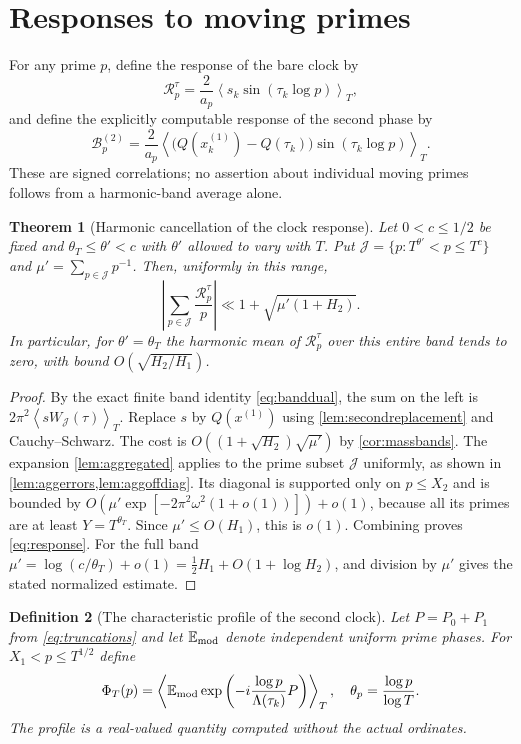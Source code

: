 \documentclass[11pt,reqno]{amsart}
\numberwithin{equation}{section}
\newtheorem{theorem}{Theorem}[section]
\newtheorem{definition}[theorem]{Definition}
\newcommand{\av}[1]{\left\langle #1\right\rangle_T}
\begin{document}
\section{Responses to moving primes}\label{sec:responses}
For any prime $p$, define the response of the bare clock by
\begin{equation}\label{eq:Rresponse}
\mathcal R_p^\tau
=\frac2{a_p}\av{s_k\sin(\tau_k\log p)},
\end{equation}
and define the explicitly computable response of the second
phase by
\begin{equation}\label{eq:Bresponse}
\mathcal B_p^{(2)}
=\frac2{a_p}\av{\bigl(Q(x_k^{(1)})-Q(\tau_k)\bigr)
\sin(\tau_k\log p)}.
\end{equation}
These are signed correlations; no assertion about individual
moving primes follows from a harmonic-band average alone.

\begin{theorem}[Harmonic cancellation of the clock response]
\label{thm:response}
Let $0<c\le1/2$ be fixed and
$\theta_T\le\theta'<c$ with $\theta'$ allowed to vary with $T$.
Put
$\mathcal J=\{p:T^{\theta'}<p\le T^c\}$ and
$\mu'=\sum_{p\in\mathcal J}p^{-1}$.
Then, uniformly in this range,
\begin{equation}\label{eq:response}
\left|\sum_{p\in\mathcal J}\frac{\mathcal R_p^\tau}{p}\right|
\ll1+\sqrt{\mu'(1+H_2)}.
\end{equation}
In particular, for $\theta'=\theta_T$ the harmonic mean of
$\mathcal R_p^\tau$ over this entire band tends to zero,
with bound $O(\sqrt{H_2/H_1})$.
\end{theorem}
\begin{proof}
By the exact finite band identity \eqref{eq:banddual}, the sum
on the left is $2\pi^2\av{sW_{\mathcal J}(\tau)}$.
Replace $s$ by $Q(x^{(1)})$ using
\cref{lem:secondreplacement} and Cauchy--Schwarz.
The cost is $O((1+\sqrt{H_2})\sqrt{\mu'})$ by
\cref{cor:massbands}.  The expansion
\cref{lem:aggregated} applies to the prime subset $\mathcal J$
uniformly, as shown in \cref{lem:aggerrors,lem:aggoffdiag}.
Its diagonal is supported only on $p\le X_2$ and is bounded
by $O(\mu'\exp[-2\pi^2\omega^2(1+o(1))])+o(1)$,
because all its primes are at least $Y=T^{\theta_T}$.
Since $\mu'\le O(H_1)$, this is $o(1)$.
Combining proves \eqref{eq:response}.
For the full band $\mu'=\log(c/\theta_T)+o(1)
=\tfrac12H_1+O(1+\log H_2)$, and division by $\mu'$
gives the stated normalized estimate.
\end{proof}

\begin{definition}[The characteristic profile of the second clock]
\label{def:profile}
Let $P=P_0+P_1$ from \eqref{eq:truncations} and let
$\mathbb E_{\rm mod}$ denote independent uniform prime phases.
For $X_1<p\le T^{1/2}$ define
\begin{equation}\label{eq:profile}
\Phi_T(p)=\av{\mathbb E_{\rm mod}
\exp\left(-i\frac{\log p}{\Lambda(\tau_k)}P\right)},
\quad\theta_p=\frac{\log p}{\log T}.
\end{equation}
The profile is a real-valued quantity computed without the actual
ordinates.
\end{definition}
\end{document}
